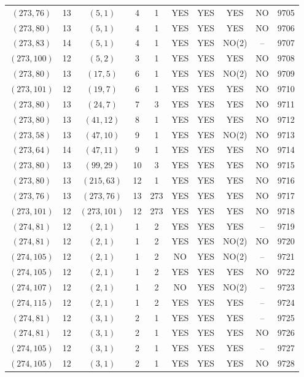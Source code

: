 \begin{longtable}{|c|c|c|c|c|c|c|c|c|c|}
$(273, 76)$ & 13 & $(5, 1)$ & 4 & 1 & YES & YES & YES & NO & 9705\\
$(273, 80)$ & 13 & $(5, 1)$ & 4 & 1 & YES & YES & YES & NO & 9706\\
$(273, 83)$ & 14 & $(5, 1)$ & 4 & 1 & YES & YES & NO(2) & -- & 9707\\
$(273, 100)$ & 12 & $(5, 2)$ & 3 & 1 & YES & YES & YES & NO & 9708\\
$(273, 80)$ & 13 & $(17, 5)$ & 6 & 1 & YES & YES & NO(2) & NO & 9709\\
$(273, 101)$ & 12 & $(19, 7)$ & 6 & 1 & YES & YES & YES & NO & 9710\\
$(273, 80)$ & 13 & $(24, 7)$ & 7 & 3 & YES & YES & YES & NO & 9711\\
$(273, 80)$ & 13 & $(41, 12)$ & 8 & 1 & YES & YES & YES & NO & 9712\\
$(273, 58)$ & 13 & $(47, 10)$ & 9 & 1 & YES & YES & NO(2) & NO & 9713\\
$(273, 64)$ & 14 & $(47, 11)$ & 9 & 1 & YES & YES & YES & NO & 9714\\
$(273, 80)$ & 13 & $(99, 29)$ & 10 & 3 & YES & YES & YES & NO & 9715\\
$(273, 80)$ & 13 & $(215, 63)$ & 12 & 1 & YES & YES & YES & NO & 9716\\
$(273, 76)$ & 13 & $(273, 76)$ & 13 & 273 & YES & YES & YES & NO & 9717\\
$(273, 101)$ & 12 & $(273, 101)$ & 12 & 273 & YES & YES & YES & NO & 9718\\
$(274, 81)$ & 12 & $(2, 1)$ & 1 & 2 & YES & YES & YES & -- & 9719\\
$(274, 81)$ & 12 & $(2, 1)$ & 1 & 2 & YES & YES & NO(2) & NO & 9720\\
$(274, 105)$ & 12 & $(2, 1)$ & 1 & 2 & NO & YES & NO(2) & -- & 9721\\
$(274, 105)$ & 12 & $(2, 1)$ & 1 & 2 & YES & YES & YES & NO & 9722\\
$(274, 107)$ & 12 & $(2, 1)$ & 1 & 2 & NO & YES & NO(2) & -- & 9723\\
$(274, 115)$ & 12 & $(2, 1)$ & 1 & 2 & YES & YES & YES & -- & 9724\\
$(274, 81)$ & 12 & $(3, 1)$ & 2 & 1 & YES & YES & YES & -- & 9725\\
$(274, 81)$ & 12 & $(3, 1)$ & 2 & 1 & YES & YES & YES & NO & 9726\\
$(274, 105)$ & 12 & $(3, 1)$ & 2 & 1 & YES & YES & YES & -- & 9727\\
$(274, 105)$ & 12 & $(3, 1)$ & 2 & 1 & YES & YES & YES & NO & 9728\\

\end{longtable}
